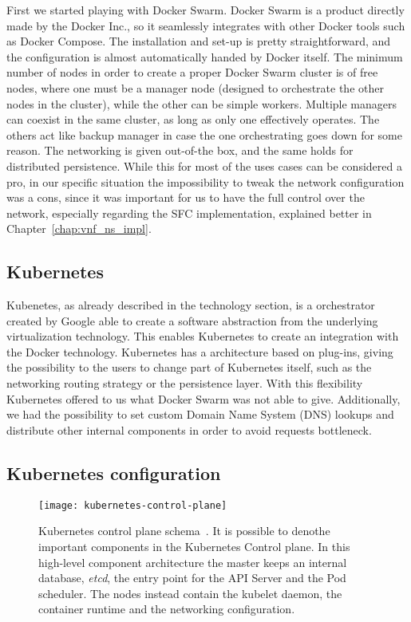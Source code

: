 First we started playing with Docker Swarm. Docker Swarm is a product directly
made by the Docker Inc., so it seamlessly integrates with other Docker tools
such as Docker Compose. The installation and set-up is pretty straightforward,
and the configuration is almost automatically handed by Docker itself. The
minimum number of nodes in order to create a proper Docker Swarm cluster is of
free nodes, where one must be a manager node (designed to orchestrate the other
nodes in the cluster), while the other can be simple workers. Multiple managers
can coexist in the same cluster, as long as only one effectively operates. The
others act like backup manager in case the one orchestrating goes down for some
reason. The networking is given out-of-the box, and the same holds for
distributed persistence. While this for most of the uses cases can be considered
a pro, in our specific situation the impossibility to tweak the network
configuration was a cons, since it was important for us to have the full control
over the network, especially regarding the SFC implementation, explained better
in Chapter~\ref{chap:vnf_ns_impl}.

\subsection{Kubernetes}
Kubenetes, as already described in the technology section, is a orchestrator 
created by Google able to create a software abstraction from the underlying 
virtualization technology. This enables Kubernetes to create an integration 
with the Docker technology. Kubernetes has a architecture based on plug-ins, 
giving  the possibility to the users to change part of Kubernetes itself, such 
as the networking routing strategy or the persistence layer. With this 
flexibility Kubernetes offered to us what Docker Swarm was not able to give. 
Additionally, we had the possibility to set custom Domain Name System (DNS) 
lookups and distribute other internal components in order to avoid requests 
bottleneck.

\subsection{Kubernetes configuration}

\begin{figure}[t]
  \centering
  \texttt{[image: kubernetes-control-plane]}
  \caption[Kubernetes control plane schema]{Kubernetes control plane
    schema~\cite{k8scp}. It is possible to denothe important components in the
    Kubernetes Control plane. In this high-level component architecture the
    master keeps an internal database, \emph{etcd}, the entry point for the API
    Server and the Pod scheduler. The nodes instead contain the kubelet daemon,
    the container runtime and the networking configuration.}
  \label{chap:archimpl:sec:secondattempt:img:k8scp}
\end{figure}

